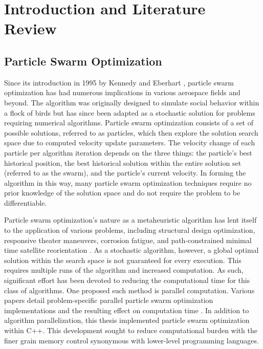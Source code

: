 \chapter{Introduction and Literature Review}
\newpage


\section{Particle Swarm Optimization}

\noindent Since its introduction in 1995 by Kennedy and Eberhart \citep{Initial_PSO}, particle swarm optimization has had numerous implications in various aerospace fields and beyond.
The algorithm was originally designed to simulate social behavior within a flock of birds but has since been adapted as a stochastic solution for problems
requiring numerical algorithms. Particle swarm optimization consists of a set of possible solutions, referred to as particles, which then explore the solution search space due to
computed velocity update parameters. The velocity change of each particle per algorithm iteration depends on the three things: the particle's best historical position, the best historical
solution within the entire solution set (referred to as the swarm), and the particle's current velocity. In forming the algorithm in this way, many particle swarm optimization techniques 
require no prior knowledge of the solution space and do not require the problem to be differentiable. \newline

\noindent Particle swarm optimization's nature as a metaheuristic algorithm has lent itself to the application of various problems,
including structural design optimization, responsive theater maneuvers, corrosion fatigue, and path-constrained minimal time satellite reorientation
\citep{PSO1, PSO2, PSO3, PSO4}. As a stochastic algorithm, however, a global optimal solution within the search space is not guaranteed for every execution. 
This requires multiple runs of the algorithm and increased computation. As such, significant effort has been devoted to reducing the computational time for this class of
algorithms. One proposed such method is parallel computation. Various papers detail problem-specific parallel particle swarm optimization implementations and the resulting 
effect on computation time \citep{PPSO1, PPSO2, PPSO3}. In addition to algorithm parallelization, this thesis implemented particle swarm optimization within C++.
This development sought to reduce computational
burden with the finer grain memory control synonymous with lower-level programming languages. \newline

